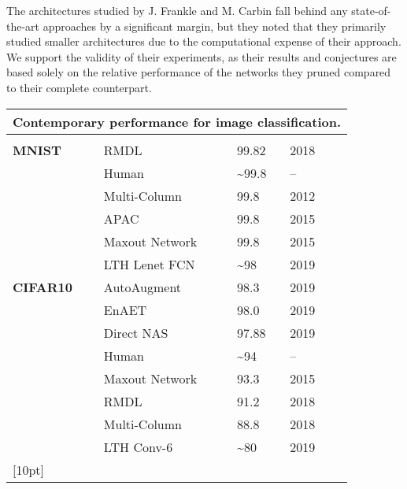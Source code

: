 The architectures studied by J. Frankle and M. Carbin fall behind any state-of-the-art approaches by a significant margin, but they noted that they primarily studied smaller architectures due to the computational expense of their approach.\cite{LTH}
We support the validity of their experiments, as their results and conjectures are based solely on the relative performance of the networks they pruned compared to their complete counterpart.\\
\begin{tabularx}{\textwidth}{X X X X X}
	\multicolumn{5}{c}{\textbf{Contemporary performance for image classification.}}\\
	\hline
	\endhead
	\\
	\textbf{MNIST} & RMDL & 99.82 & 2018 & \cite{RMDL}\\
	& Human & \textasciitilde99.8 & -- & \cite{MNIST-Human}\\
	& Multi-Column & 99.8 & 2012 & \cite{Multi-Column}\\
	& APAC & 99.8 & 2015 & \cite{APAC}\\
	& Maxout Network & 99.8 & 2015 & \cite{Batch-Normalized}\\
	& LTH Lenet FCN & \textasciitilde98 & 2019 & \cite{LTH}\\
	[14pt]
	\textbf{CIFAR10} & AutoAugment & 98.3 & 2019 & \cite{Auto-Augment}\\
	& EnAET & 98.0 & 2019 & \cite{EnAET}\\
	& Direct NAS & 97.88 & 2019 & \cite{Direct-NAS}\\
	& Human & \textasciitilde94 & -- & \cite{CIFAR10-Human}\\
	& Maxout Network & 93.3 & 2015 & \cite{Batch-Normalized}\\
	& RMDL & 91.2 & 2018 & \cite{RMDL}\\
	& Multi-Column & 88.8 & 2018 & \cite{Multi-Column}\\
	& LTH Conv-6 & \textasciitilde80 & 2019 & \cite{LTH}\\
	[10pt]
	\hline
\end{tabularx}



